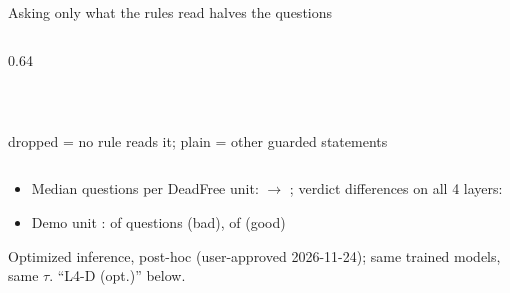 \begin{frame}{Asking only what the rules read halves the questions}
\begin{columns}[c]
\begin{column}{0.64\textwidth}
\begin{tabular}{@{}lll@{}}
        \bottomrule
      \end{tabular}\\[2pt]
      {\scriptsize \textcolor{NeutDraw}{dropped = no rule reads it; plain = other guarded statements}\par}
    \end{column}
  \end{columns}
  \vspace{6pt}
  \begin{itemize}
    \item Median questions per DeadFree unit:  $\to$ \alert{};
      verdict differences on all 4 layers: 
    \item Demo unit :  of  questions (bad),
       of  (good)
  \end{itemize}
  \vfill
  {\scriptsize Optimized inference, post-hoc (user-approved 2026-11-24); same trained models, same $\tau$. ``L4-D (opt.)'' below.\par}
\end{frame}

